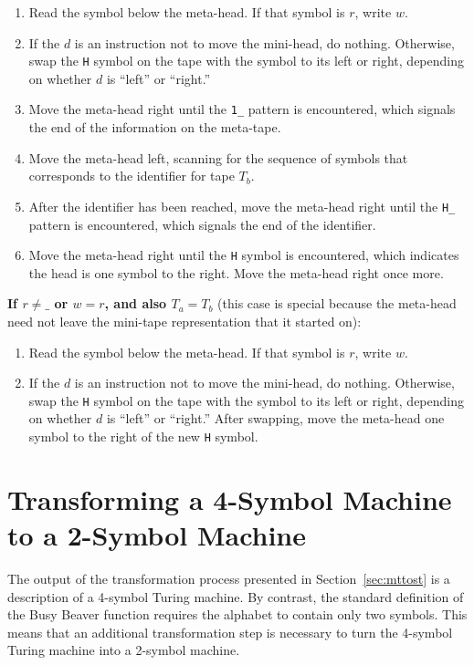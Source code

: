 \documentclass[11pt]{report}
\begin{document}
\begin{enumerate}

\item Read the symbol below the meta-head. If that symbol is $r$, write $w$.
\item If the $d$ is an instruction not to move the mini-head, do nothing. Otherwise, swap the \texttt{H} symbol on the tape with the symbol to its left or right, depending on whether $d$ is ``left'' or ``right.''
\item Move the meta-head right until the \texttt{1\_} pattern is encountered, which signals the end of the information on the meta-tape.
\item Move the meta-head left, scanning for the sequence of symbols that corresponds to the identifier for tape $T_b$.
\item After the identifier has been reached, move the meta-head right until the \texttt{H\_} pattern is encountered, which signals the end of the identifier.
\item Move the meta-head right until the \texttt{H} symbol is encountered, which indicates the head is one symbol to the right. Move the meta-head right once more.

\end{enumerate}

\textbf{If $r \not= \texttt{\_}$ or $w = r$, and also $T_a = T_b$} (this case is special because the meta-head need not leave the mini-tape representation that it started on):
\begin{enumerate}

\item Read the symbol below the meta-head. If that symbol is $r$, write $w$.
\item If the $d$ is an instruction not to move the mini-head, do nothing. Otherwise, swap the \texttt{H} symbol on the tape with the symbol to its left or right, depending on whether $d$ is ``left'' or ``right.'' After swapping, move the meta-head one symbol to the right of the new \texttt{H} symbol.

\end{enumerate}

\section{Transforming a 4-Symbol Machine to a 2-Symbol Machine \label{sec:mstots}}

The output of the transformation process presented in Section~\ref{sec:mttost} is a description of a 4-symbol Turing machine. By contrast, the standard definition of the Busy Beaver function requires the alphabet to contain only two symbols. This means that an additional transformation step is necessary to turn the 4-symbol Turing machine into a 2-symbol machine. \\
\end{document}
